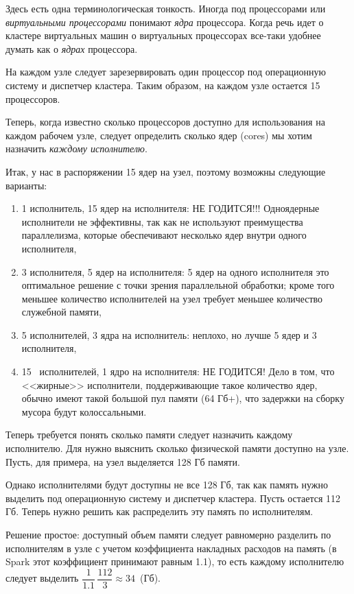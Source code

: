\documentclass[%
	11pt,
	a4paper,
	utf8,
		]{article}
\begin{document}
Здесь есть одна терминологическая тонкость. Иногда под процессорами или \emph{виртуальными процессорами} понимают \emph{ядра} процессора. Когда речь идет о кластере виртуальных машин о виртуальных процессорах все-таки удобнее думать как о \emph{ядрах} процессора.

На каждом узле следует зарезервировать один процессор под операционную систему и диспетчер кластера. Таким образом, на каждом узле остается 15 процессоров.

Теперь, когда известно сколько процессоров доступно для использования на каждом рабочем узле, следует определить сколько ядер (cores) мы хотим назначить \emph{каждому исполнителю}.

Итак, у нас в распоряжении 15 ядер на узел, поэтому возможны следующие варианты:
\begin{enumerate}
	\item 1 исполнитель, 15 ядер на исполнителя: НЕ ГОДИТСЯ!!! Одноядерные исполнители не эффективны, так как не используют преимущества параллелизма, которые обеспечивают несколько ядер внутри одного исполнителя,
	
	\item 3 исполнителя, 5 ядер на исполнителя: 5 ядер на одного исполнителя это оптимальное решение с точки зрения параллельной обработки; кроме того меньшее количество исполнителей на узел требует меньшее количество служебной памяти,
	
	\item 5 исполнителей, 3 ядра на исполнитель: неплохо, но лучше 5 ядер и 3 исполнителя,
	
	\item 15  исполнителей, 1 ядро на исполнителя: НЕ ГОДИТСЯ! Дело в том, что <<жирные>> исполнители, поддерживающие такое количество ядер, обычно имеют такой большой пул памяти (64 Гб+), что задержки на сборку мусора будут колоссальными.
\end{enumerate}

Теперь требуется понять сколько памяти следует назначить каждому исполнителю. Для нужно выяснить сколько физической памяти доступно на узле. Пусть, для примера, на узел выделяется 128 Гб памяти.

Однако исполнителями будут доступны не все 128 Гб, так как память нужно выделить под операционную систему и диспетчер кластера. Пусть остается 112 Гб. Теперь нужно решить как распределить эту память по исполнителям.

Решение простое: доступный объем памяти следует равномерно разделить по исполнителям в узле с учетом коэффициента накладных расходов на память (в Spark этот коэффициент принимают равным 1.1), то есть  каждому исполнителю следует выделить $ \dfrac{1}{1.1}\, \dfrac{112}{3} \approx 34$~(Гб).
\end{document}
